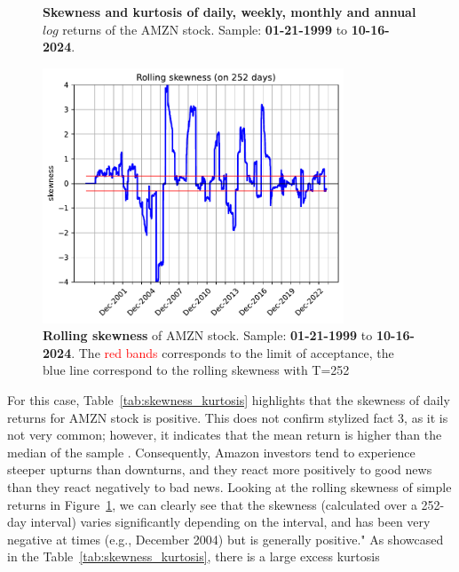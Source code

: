 \documentclass{article}
\begin{document}
\begin{figure}[H]
    \centering
    \begin{minipage}{0.45\textwidth}
        \begin{table}[H]
            \centering
              
            \caption{\textbf{Skewness and kurtosis of daily, weekly, monthly and annual} $log$ returns of the AMZN stock. 
            Sample: \textbf{01-21-1999} to \textbf{10-16-2024}.}
            \label{tab:skewness_kurtosis}
        \end{table}
    \end{minipage}
    \hspace{0.05\textwidth}
    \begin{minipage}{0.45\textwidth}
        \centering
        \includegraphics[width=0.8\textwidth]{Img/Fact3_2_rollskew.pdf}
        \caption{\textbf{Rolling skewness} of AMZN stock. 
        Sample: \textbf{01-21-1999} to \textbf{10-16-2024}. The \textcolor{red}{red bands} corresponds to the limit of acceptance, the blue line correspond to the rolling skewness with T=252}
        \label{fig:Rolling_skewness}
    \end{minipage}
\end{figure}

\noindent For this case, Table~\ref{tab:skewness_kurtosis} highlights that the skewness of daily returns for AMZN stock is positive.
This does not confirm stylized fact 3, as it is not very common; however, it indicates that the mean return is higher than the median of the sample \cite{albuquerque2012skewness}. 
Consequently, Amazon investors tend to experience steeper upturns than downturns, and they react more positively to good news than they react negatively to bad news.
Looking at the rolling skewness of simple returns in Figure~\ref{fig:Rolling_skewness}, we can clearly see that the skewness (calculated over a 252-day interval) 
varies significantly depending on the interval, and has been very negative at times (e.g., December 2004) but is generally positive."
\noindent As showcased in the Table~\ref{tab:skewness_kurtosis}, there is a large excess kurtosis
\end{document}
